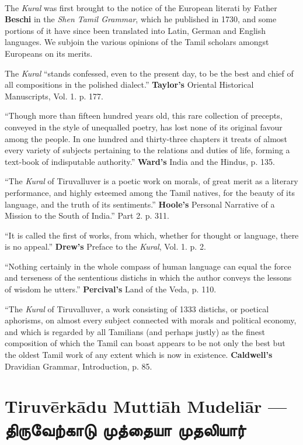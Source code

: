 \documentclass{article}
\newcommand{\TamilBold}[1]{\texttamil{\textbf{#1}}}
\newcommand{\tambold}[1]{\TamilBold{#1}}
\begin{document}
\paragraph{}
The \emph{Kural} was first brought to the notice of the European literati by Father \textbf{Beschi} in the \emph{Shen Tamil Grammar}, which he published in 1730, and some portions of it have since been translated into Latin, German and English languages. We subjoin the various opinions of the Tamil scholars amongst Europeans on its merits.

The \emph{Kural} ``stands confessed, even to the present day, to be the best and chief of all compositions in the polished dialect.'' \textbf{Taylor's} Oriental Historical Manuscripts, Vol. 1. p. 177.

``Though more than fifteen hundred years old, this rare collection of precepts, conveyed in the style of unequalled poetry, has lost none of its original favour among the people. In one hundred and thirty-three chapters it treats of almost every variety of subjects pertaining to the relations and duties of life, forming a text-book of indisputable authority.'' \textbf{Ward's} India and the Hindus, p. 135.

``The \emph{Kural} of Tiruvalluver is a poetic work on morals, of great merit as a literary performance, and highly esteemed among the Tamil natives, for the beauty of its language, and the truth of its sentiments.'' \textbf{Hoole's} Personal Narrative of a Mission to the South of India.'' Part 2. p. 311.

``It is called the first of works, from which, whether for thought or language, there is no appeal.'' \textbf{Drew's} Preface to the \emph{Kural}, Vol. 1. p. 2.

``Nothing certainly in the whole compass of human language can equal the force and terseness of the sententious distichs in which the author conveys the lessons of wisdom he utters.'' \textbf{Percival's} Land of the Veda, p. 110.

``The \emph{Kural} of Tiruvalluver, a work consisting of 1333 distichs, or poetical aphorisms, on almost every subject connected with morals and political economy, and which is regarded by all Tamilians (and perhaps justly) as the finest composition of which the Tamil can boast appears to be not only the best but the oldest Tamil work of any extent which is now in existence. \textbf{Caldwell's} Dravidian Grammar, Introduction, p. 85.

\section{Tiruv\={e}rk\={a}du Mutti\={a}h Mudeli\={a}r --- \tambold{திருவேற்காடு முத்தையா முதலியார்}}
\end{document}
